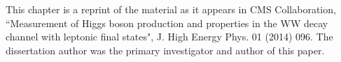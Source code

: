  This chapter is a reprint of the material as it appears in CMS Collaboration, 
 ``Measurement of Higgs boson production and properties in the WW decay channel with 
 leptonic final states", J. High Energy Phys. 01 (2014) 096. 
The dissertation author was the primary investigator and author of this paper. 
